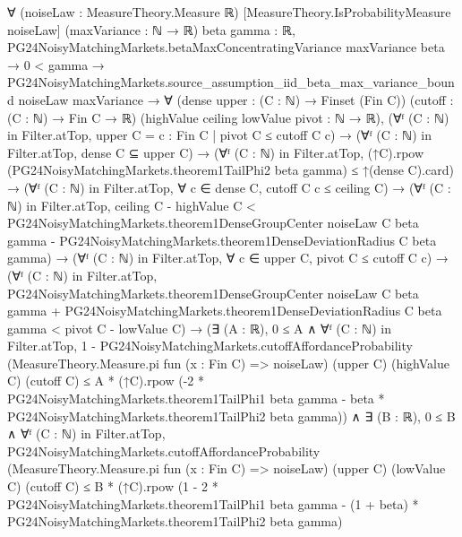 \documentclass[10pt]{article}
\begin{document}
\begin{ReviewVerbatim}
∀ (noiseLaw : MeasureTheory.Measure ℝ) [MeasureTheory.IsProbabilityMeasure noiseLaw] (maxVariance : ℕ → ℝ)
  {beta gamma : ℝ},
  PG24NoisyMatchingMarkets.betaMaxConcentratingVariance maxVariance beta →
    0 < gamma →
      PG24NoisyMatchingMarkets.source_assumption_iid_beta_max_variance_bound noiseLaw maxVariance →
        ∀ (dense upper : (C : ℕ) → Finset (Fin C)) (cutoff : (C : ℕ) → Fin C → ℝ)
          (highValue ceiling lowValue pivot : ℕ → ℝ),
          (∀ᶠ (C : ℕ) in Filter.atTop, upper C = {c : Fin C | pivot C ≤ cutoff C c}) →
            (∀ᶠ (C : ℕ) in Filter.atTop, dense C ⊆ upper C) →
              (∀ᶠ (C : ℕ) in Filter.atTop,
                  (↑C).rpow (PG24NoisyMatchingMarkets.theorem1TailPhi2 beta gamma) ≤ ↑(dense C).card) →
                (∀ᶠ (C : ℕ) in Filter.atTop, ∀ c ∈ dense C, cutoff C c ≤ ceiling C) →
                  (∀ᶠ (C : ℕ) in Filter.atTop,
                      ceiling C - highValue C <
                        PG24NoisyMatchingMarkets.theorem1DenseGroupCenter noiseLaw C beta gamma -
                          PG24NoisyMatchingMarkets.theorem1DenseDeviationRadius C beta gamma) →
                    (∀ᶠ (C : ℕ) in Filter.atTop, ∀ c ∈ upper C, pivot C ≤ cutoff C c) →
                      (∀ᶠ (C : ℕ) in Filter.atTop,
                          PG24NoisyMatchingMarkets.theorem1DenseGroupCenter noiseLaw C beta gamma +
                              PG24NoisyMatchingMarkets.theorem1DenseDeviationRadius C beta gamma <
                            pivot C - lowValue C) →
                        (∃ (A : ℝ),
                            0 ≤ A ∧
                              ∀ᶠ (C : ℕ) in Filter.atTop,
                                1 -
                                    PG24NoisyMatchingMarkets.cutoffAffordanceProbability
                                      (MeasureTheory.Measure.pi fun (x : Fin C) => noiseLaw) (upper C) (highValue C)
                                      (cutoff C) ≤
                                  A *
                                    (↑C).rpow
                                      (-2 * PG24NoisyMatchingMarkets.theorem1TailPhi1 beta gamma -
                                        beta * PG24NoisyMatchingMarkets.theorem1TailPhi2 beta gamma)) ∧
                          ∃ (B : ℝ),
                            0 ≤ B ∧
                              ∀ᶠ (C : ℕ) in Filter.atTop,
                                PG24NoisyMatchingMarkets.cutoffAffordanceProbability
                                    (MeasureTheory.Measure.pi fun (x : Fin C) => noiseLaw) (upper C) (lowValue C)
                                    (cutoff C) ≤
                                  B *
                                    (↑C).rpow
                                      (1 - 2 * PG24NoisyMatchingMarkets.theorem1TailPhi1 beta gamma -
                                        (1 + beta) * PG24NoisyMatchingMarkets.theorem1TailPhi2 beta gamma)
\end{ReviewVerbatim}
\end{document}
